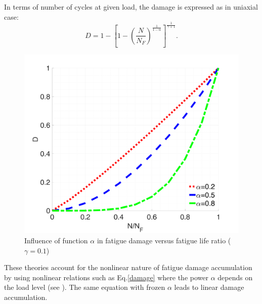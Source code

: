 In terms of number of cycles at given load, the damage is expressed as in uniaxial case:
\begin{equation}D=1-\left[ 1-\left( \frac{N}{N_F}\right) ^{\frac{1}{1-\alpha}}\right] ^{\frac{1}{\gamma+1}}.
\label{damage}
\end{equation}

\begin{figure}[!h]
	\centering
	\includegraphics[width=\textwidth]{figures//Dratio1.png}
	\vspace{-12pt}
	\caption{Influence of function $\alpha$ in fatigue damage versus fatigue life ratio ($\gamma=0.1$)}
	\label{Alpha}
\end{figure}
These theories account for the nonlinear nature of fatigue damage accumulation by using nonlinear relations such as Eq.\eqref{damage} where the power $\alpha$ depends on the load level (see ). The same equation with frozen $\alpha$ leads to linear damage accumulation.



